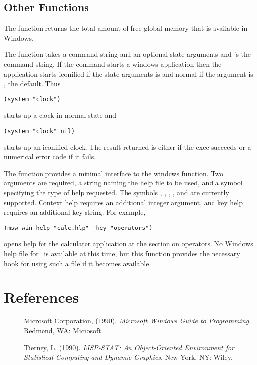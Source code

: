 \subsection{Other Functions}
The function  returns the total amount of free
global memory that is available in Windows.

The  function takes a command string and an optional
state arguments and 's the command string. If the
command starts a windows application then the application starts
iconified if the state arguments is  and normal if the
argument is , the default. Thus
\begin{verbatim}
(system "clock")
\end{verbatim}
starts up a clock in normal state and
\begin{verbatim}
(system "clock" nil)
\end{verbatim}
starts up an iconified clock. The result returned is either 
if the exec succeeds or a numerical error code if it fails.

The function  provides a minimal interface to the
windows  function. Two arguments are required, a string
naming the help file to be used, and a symbol specifying the type of
help requested. The symbols , ,
, , and  are currently supported.
Context help requires an additional integer argument, and key help
requires an additional key string. For example,
\begin{verbatim}
(msw-win-help "calc.hlp" 'key "operators")
\end{verbatim}
opens help for the calculator application at the section on operators.
No Windows help file for \XLS\ is available at this time, but this
function provides the necessary hook for using such a file if it
becomes available.

\section*{References}
\begin{description}
\item[]
Microsoft Corporation, (1990). {\em Microsoft Windows Guide to
Programming}.  Redmond, WA: Microsoft.
\item[]
Tierney, L. (1990). {\em LISP-STAT: An Object-Oriented Environment for
Statistical Computing and Dynamic Graphics}. New York, NY: Wiley.
\end{description}


